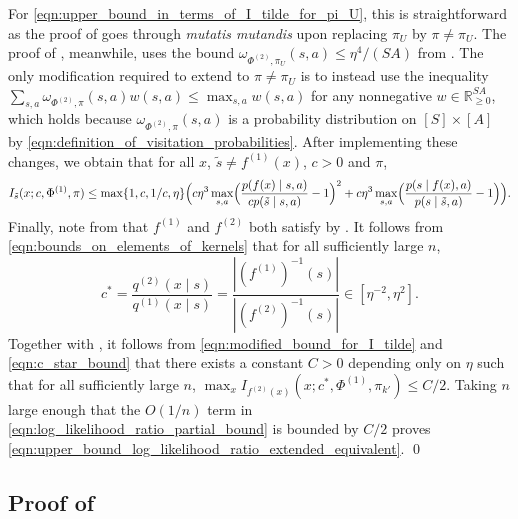 \documentclass[11pt]{article}
\newcommand{\mbbR}{\mathbb{R}}
\theoremstyle{definition}
\theoremstyle{definition}
\begin{document}
For \eqref{eqn:upper_bound_in_terms_of_I_tilde_for_pi_U}, this is straightforward as the proof of \cite[Proposition 11]{Jedra:2022} goes through \emph{mutatis mutandis} upon replacing $\pi_U$ by $\pi\neq \pi_U$.
The proof of \cite[Proposition 12]{Jedra:2022}, meanwhile, uses the bound $\omega_{\Phi^{(2)},\pi_U}(s,a)\leq \eta^4/(SA)$ from \cite[Proposition 14]{Jedra:2022}.
The only modification required to extend \cite[Proposition 12]{Jedra:2022} to $\pi\neq\pi_U$ is to instead use the inequality $\sum_{s,a}\omega_{\Phi^{(2)},\pi}(s,a)w(s,a)\leq \max_{s,a}w(s,a)$ for any nonnegative $w\in \mbbR^{S A}_{\geq 0}$, which holds because $\omega_{\Phi^{(2)},\pi}(s,a)$ is a probability distribution on $[S]\times[A]$ by \eqref{eqn:definition_of_visitation_probabilities}.
After implementing these changes, we obtain that for all $x$, $\tilde{s}\neq f^{(1)}(x)$, $c>0$ and $\pi$,
\begin{equation}
	\label{eqn:modified_bound_for_I_tilde}
	I_{\tilde{s}}(x;c,\Phi^{(1)},\pi)
	\leq
	\max\{1,c,1/c,\eta\}
	\Bigl(
		c\eta^3\max_{s,a}\Bigl(
			\frac{p(f(x)\mid s,a)}{cp(\tilde{s}\mid s,a)}-1
		\Bigr)^2
		+
		c\eta^3\max_{s,a}\Bigl(
			\frac{p(s\mid f(x),a)}{p(s\mid \tilde{s},a)}-1
		\Bigr)
	\Bigr)
	.
\end{equation}
Finally, note from  that $f^{(1)}$ and $f^{(2)}$ both satisfy  by .
It follows from \eqref{eqn:bounds_on_elements_of_kernels} that for all sufficiently large $n$,
\begin{equation}
	\label{eqn:c_star_bound}
	c^*
	=
	\frac{q^{(2)}(x\mid s)}{q^{(1)}(x\mid s)}
	=
	\frac{|(f^{(1)})^{-1}(s)|}{|(f^{(2)})^{-1}(s)|}
	\in
	[\eta^{-2},\eta^2]
	.
\end{equation}
Together with , it follows from \eqref{eqn:modified_bound_for_I_tilde} and \eqref{eqn:c_star_bound} that there exists a constant $C>0$ depending only on $\eta$ such that for all sufficiently large $n$, $\max_x I_{f^{(2)}(x)}(x;c^*,\Phi^{(1)},\pi_{k'})\leq C/2$.
Taking $n$ large enough that the $O(1/n)$ term in \eqref{eqn:log_likelihood_ratio_partial_bound} is bounded by $C/2$ proves \eqref{eqn:upper_bound_log_likelihood_ratio_extended_equivalent}.
\qed

\subsection{Proof of \texorpdfstring{}{properties of the permutation}}
\label{sec:proof_of_Px_is_a_permutation}
\end{document}
